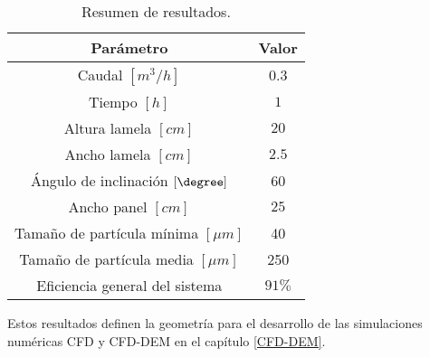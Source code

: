 \begin{table}[h!]
	\centering
	\begin{tabular}{c|c}
		\hline
		\textbf{Par\'ametro} & \textbf{Valor} \\ \hline
		Caudal $\left[m^3 /h \right]$ & $0.3$ \\ \hline
		Tiempo $[h]$ & $1$ \\ \hline
		Altura lamela $[cm]$ & $20$ \\ \hline
		Ancho lamela $[cm]$ & $2.5$ \\ \hline
		\'Angulo de inclinaci\'on $[\degree ]$ & 60 \\ \hline
		Ancho panel $[cm]$ & $25$ \\ \hline
		Tama\~no de part\'icula m\'inima $[\mu m]$ & 40 \\ \hline
		Tama\~no de part\'icula media $[\mu m]$ & 250 \\ \hline
		Eficiencia general del sistema & $91 \%$ \\ \hline
	\end{tabular}
	\caption{Resumen de resultados.}
	\label{resul_dis}
\end{table}

\noindent
\justify

Estos resultados definen la geometr\'ia para el desarrollo de las simulaciones num\'ericas CFD y CFD-DEM en el cap\'itulo \ref{CFD-DEM}.